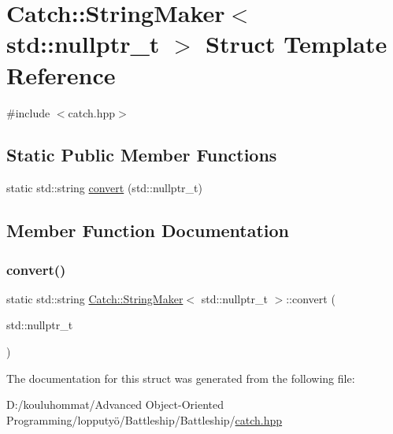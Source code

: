 \hypertarget{struct_catch_1_1_string_maker_3_01std_1_1nullptr__t_01_4}{}\section{Catch\+:\+:String\+Maker$<$ std\+:\+:nullptr\+\_\+t $>$ Struct Template Reference}
\label{struct_catch_1_1_string_maker_3_01std_1_1nullptr__t_01_4}


{\ttfamily \#include $<$catch.\+hpp$>$}

\subsection*{Static Public Member Functions}
\begin{DoxyCompactItemize}
\item 
static std\+::string \mbox{\hyperlink{struct_catch_1_1_string_maker_3_01std_1_1nullptr__t_01_4_a131fbb1f5cd68c93aaf30d34e3519e9c}{convert}} (std\+::nullptr\+\_\+t)
\end{DoxyCompactItemize}


\subsection{Member Function Documentation}
\mbox{\label{struct_catch_1_1_string_maker_3_01std_1_1nullptr__t_01_4_a131fbb1f5cd68c93aaf30d34e3519e9c}} 
\subsubsection{\texorpdfstring{convert()}{convert()}}
{\footnotesize\ttfamily static std\+::string \mbox{\hyperlink{struct_catch_1_1_string_maker}{Catch\+::\+String\+Maker}}$<$ std\+::nullptr\+\_\+t $>$\+::convert (\begin{DoxyParamCaption}\item[{std\+::nullptr\+\_\+t}]{ }\end{DoxyParamCaption})\hspace{0.3cm}{\ttfamily [static]}}



The documentation for this struct was generated from the following file\+:\begin{DoxyCompactItemize}
\item 
D\+:/kouluhommat/\+Advanced Object-\/\+Oriented Programming/lopputyö/\+Battleship/\+Battleship/\mbox{\hyperlink{catch_8hpp}{catch.\+hpp}}\end{DoxyCompactItemize}
